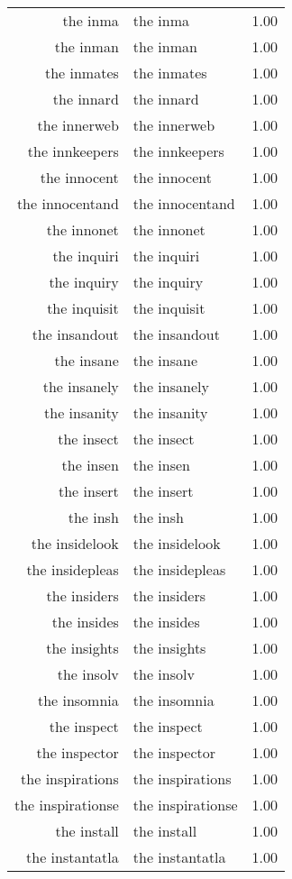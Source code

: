 \begin{table}[ht]
\begin{tabular}{rlr}
  the inma & the inma & 1.00 \\ 
  the inman & the inman & 1.00 \\ 
  the inmates & the inmates & 1.00 \\ 
  the innard & the innard & 1.00 \\ 
  the innerweb & the innerweb & 1.00 \\ 
  the innkeepers & the innkeepers & 1.00 \\ 
  the innocent & the innocent & 1.00 \\ 
  the innocentand & the innocentand & 1.00 \\ 
  the innonet & the innonet & 1.00 \\ 
  the inquiri & the inquiri & 1.00 \\ 
  the inquiry & the inquiry & 1.00 \\ 
  the inquisit & the inquisit & 1.00 \\ 
  the insandout & the insandout & 1.00 \\ 
  the insane & the insane & 1.00 \\ 
  the insanely & the insanely & 1.00 \\ 
  the insanity & the insanity & 1.00 \\ 
  the insect & the insect & 1.00 \\ 
  the insen & the insen & 1.00 \\ 
  the insert & the insert & 1.00 \\ 
  the insh & the insh & 1.00 \\ 
  the insidelook & the insidelook & 1.00 \\ 
  the insidepleas & the insidepleas & 1.00 \\ 
  the insiders & the insiders & 1.00 \\ 
  the insides & the insides & 1.00 \\ 
  the insights & the insights & 1.00 \\ 
  the insolv & the insolv & 1.00 \\ 
  the insomnia & the insomnia & 1.00 \\ 
  the inspect & the inspect & 1.00 \\ 
  the inspector & the inspector & 1.00 \\ 
  the inspirations & the inspirations & 1.00 \\ 
  the inspirationse & the inspirationse & 1.00 \\ 
  the install & the install & 1.00 \\ 
  the instantatla & the instantatla & 1.00 \\ 

\end{tabular}
\end{table}
